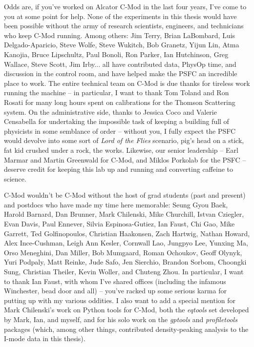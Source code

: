 Odds are, if you've worked on Alcator C-Mod in the last four years, I've come to you at some point for help.  None of the experiments in this thesis would have been possible without the army of research scientists, engineers, and technicians who keep C-Mod running.  Among others: Jim Terry, Brian LaBombard, Luis Delgado-Aparicio, Steve Wolfe, Steve Wukitch, Bob Granetz, Yijun Lin, Atma Kanojia, Bruce Lipschultz, Paul Bonoli, Ron Parker, Ian Hutchinson, Greg Wallace, Steve Scott, Jim Irby... all have contributed data, PhysOp time, and discussion in the control room, and have helped make the PSFC an incredible place to work.  The entire technical team on C-Mod is due thanks for tireless work running the machine -- in particular, I want to thank Tom Toland and Ron Rosati for many long hours spent on calibrations for the Thomson Scattering system.  On the administrative side, thanks to Jessica Coco and Valerie Censabella for undertaking the impossible task of keeping a building full of physicists in some semblance of order -- without you, I fully expect the PSFC would devolve into some sort of \emph{Lord of the Flies} scenario, pig's head on a stick, fat kid crushed under a rock, the works.  Likewise, our senior leadership -- Earl Marmar and Martin Greenwald for C-Mod, and Miklos Porkolab for the PSFC -- deserve credit for keeping this lab up and running and converting caffeine to science.

C-Mod wouldn't be C-Mod without the host of grad students (past and present) and postdocs who have made my time here memorable: Seung Gyou Baek, Harold Barnard, Dan Brunner, Mark Chilenski, Mike Churchill, Istvan Cziegler, Evan Davis, Paul Ennever, Silvia Espinosa-Gutiez, Ian Faust, Chi Gao, Mike Garrett, Ted Golfinopoulos, Christian Haakonsen, Zach Hartwig, Nathan Howard, Alex Ince-Cushman, Leigh Ann Kesler, Cornwall Lao, Jungpyo Lee, Yunxing Ma, Orso Meneghini, Dan Miller, Bob Mumgaard, Roman Ochoukov, Geoff Olynyk, Yuri Podpaly, Matt Reinke, Jude Safo, Jen Sierchio, Brandon Sorbom, Choongki Sung, Christian Theiler, Kevin Woller, and Chuteng Zhou.  In particular, I want to thank Ian Faust, with whom I've shared offices (including the infamous Winchester, bead door and all) -- you've racked up some serious karma for putting up with my various oddities.  I also want to add a special mention for Mark Chilenski's work on Python tools for C-Mod, both the \emph{eqtools} set developed by Mark, Ian, and myself, and for his solo work on the \emph{gptools} and \emph{profiletools} packages (which, among other things, contributed density-peaking analysis to the I-mode data in this thesis).

